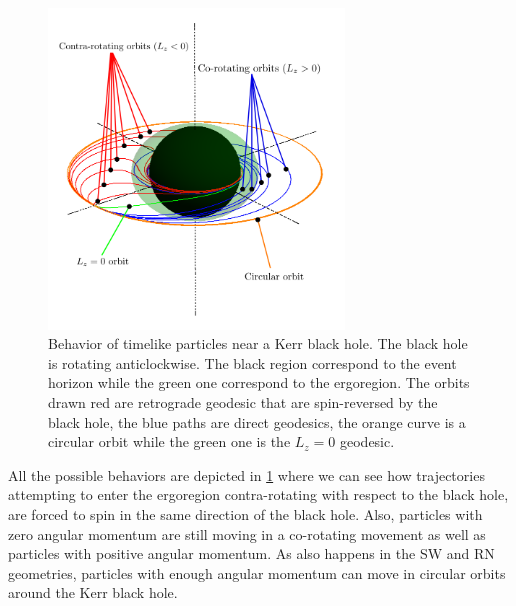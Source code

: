 \begin{figure}[hpt!]  
\begin{center}
 \centerline{\includegraphics[width=0.7\textwidth]{img/Introd/Orbits.png}}
 \end{center}
 \vspace{-1.5cm}
 \caption{Behavior of timelike particles near a Kerr black hole. The black hole is rotating anticlockwise. The black region correspond to the event horizon while the green one correspond to the ergoregion. The orbits drawn red are retrograde geodesic that are spin-reversed by the black hole, the blue paths are direct geodesics, the orange curve is a circular orbit while the green one is the $L_z=0$ geodesic.}
 \label{fig:orbits}
\end{figure} 
All the possible behaviors are depicted in \cref{fig:orbits} where we can see how trajectories attempting to enter the ergoregion contra-rotating with respect to the black hole, are forced to spin in the same direction of the black hole. Also, particles with zero angular momentum are still moving in a co-rotating movement as well as particles with positive angular momentum. As also happens in the \gls{SW} and \gls{RN} geometries, particles with enough angular momentum can move in circular orbits around the Kerr black hole.

